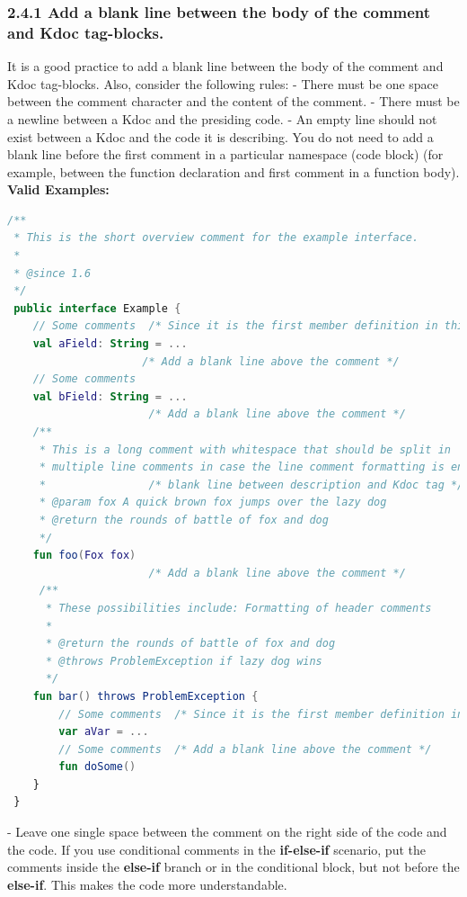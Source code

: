 \subsubsection*{\textbf{2.4.1 Add a blank line between the body of the comment and Kdoc tag-blocks.}}
\leavevmode\newline
\label{sec:2.4.1}
It is a good practice to add a blank line between the body of the comment and Kdoc tag-blocks. Also, consider the following rules:
- There must be one space between the comment character and the content of the comment.
- There must be a newline between a Kdoc and the presiding code.
- An empty line should not exist between a Kdoc and the code it is describing. You do not need to add a blank line before the first comment in a particular namespace (code block) (for example, between the function declaration and first comment in a function body).
\textbf{Valid Examples:}
\begin{lstlisting}[language=Kotlin]
/**
 * This is the short overview comment for the example interface.
 *
 * @since 1.6
 */
 public interface Example {
    // Some comments  /* Since it is the first member definition in this code block, there is no need to add a blank line here */
    val aField: String = ...
                     /* Add a blank line above the comment */
    // Some comments
    val bField: String = ...
                      /* Add a blank line above the comment */
    /**
     * This is a long comment with whitespace that should be split in
     * multiple line comments in case the line comment formatting is enabled.
     *                /* blank line between description and Kdoc tag */
     * @param fox A quick brown fox jumps over the lazy dog
     * @return the rounds of battle of fox and dog
     */
    fun foo(Fox fox)
                      /* Add a blank line above the comment */
     /**
      * These possibilities include: Formatting of header comments
      *
      * @return the rounds of battle of fox and dog
      * @throws ProblemException if lazy dog wins
      */
    fun bar() throws ProblemException {
        // Some comments  /* Since it is the first member definition in this range, there is no need to add a blank line here */
        var aVar = ...
        // Some comments  /* Add a blank line above the comment */
        fun doSome()
    }
 }
\end{lstlisting}
- Leave one single space between the comment on the right side of the code and the code.
If you use conditional comments in the \textbf{if-else-if} scenario, put the comments inside the \textbf{else-if} branch or in the conditional block, but not before the \textbf{else-if}. This makes the code more understandable.

